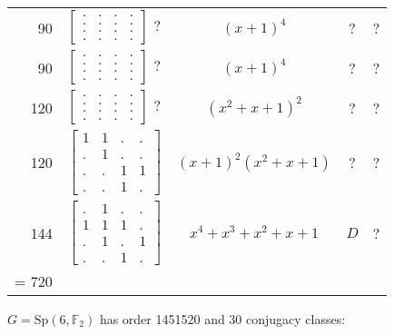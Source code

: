 \documentclass[11pt,oneside]{article}
\newcommand{\Sp}{\mathrm{Sp}}
\newcommand{\Field}{\mathbb{F}}
\begin{document}
\begin{center}
\begin{tabular}{r|l|c|c|c}
90  &  $\begin{bmatrix}.&.&.&.\\.&.&.&.\\.&.&.&.\\.&.&.&.\end{bmatrix}$ ?  & $(x+1)^4$  & ? & ?  \\
90  & $\begin{bmatrix}.&.&.&.\\.&.&.&.\\.&.&.&.\\.&.&.&.\end{bmatrix}$  ?  & $(x+1)^4$  & ? & ?  \\
120  & $\begin{bmatrix}.&.&.&.\\.&.&.&.\\.&.&.&.\\.&.&.&.\end{bmatrix}$ ?   & $(x^2+x+1)^2$  & ? & ?  \\
120  & $\begin{bmatrix}1&1&.&.\\.&1&.&.\\.&.&1&1\\.&.&1&.\end{bmatrix}$     & $(x+1)^2(x^2+x+1)$  & ? & ?  \\
144  & $\begin{bmatrix}.&1&.&.\\1&1&1&.\\.&1&.&1\\.&.&1&.\end{bmatrix}$    & $x^4+x^3+x^2+x+1$  & $D$ & ?  \\
\hline
\strut = 720 \\
\end{tabular}
\end{center}


$G = \Sp(6,\Field_2)$  has order 1451520 and 30 conjugacy classes:
\end{document}
